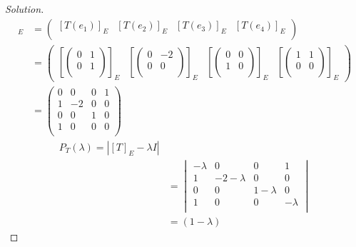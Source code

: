 \documentclass[fleqn, a4paper, 12pt]{article}
\theoremstyle{definition}
\theoremstyle{theorem}
\newenvironment{solution}
{\begin{proof}[Solution]\let\qed\relax}
	{\end{proof}}
\begin{document}
\begin{solution}
	\begin{align*}
		[T]_E &= 
			\begin{pmatrix}
				[T(e_1)]_E & [T(e_2)]_E & [T(e_3)]_E & [T(e_4)]_E\\
			\end{pmatrix}\\
		&= 
			\begin{pmatrix}
				\left[
					\begin{pmatrix}
						0 & 1\\
						0 & 1\\
					\end{pmatrix}
				\right]_E
			&
				\left[
					\begin{pmatrix}
						0 & -2\\
						0 & 0\\
					\end{pmatrix}
				\right]_E
			&
				\left[
					\begin{pmatrix}
						0 & 0\\
						1 & 0\\
					\end{pmatrix}
				\right]_E
			&
				\left[
					\begin{pmatrix}
						1 & 1\\
						0 & 0\\
					\end{pmatrix}
				\right]_E
			\end{pmatrix}\\
		&=
			\begin{pmatrix}
				0 & 0 & 0 & 1\\
				1 & -2 & 0 & 0\\
				0 & 0 & 1 & 0\\
				1 & 0 & 0 & 0\\
			\end{pmatrix}
	\end{align*}
	\begin{align*}
		P_T (\lambda) = \left\lvert [T]_E - \lambda I \right\rvert\\
		&= 
			\begin{vmatrix}
				-\lambda & 0 & 0 & 1\\
				1 & -2 - \lambda & 0 & 0\\
				0 & 0 & 1 - \lambda & 0\\
				1 & 0 & 0 & -\lambda\\
			\end{vmatrix}\\
		&= (1 - \lambda) 

\end{align*}
\end{solution}
\end{document}
